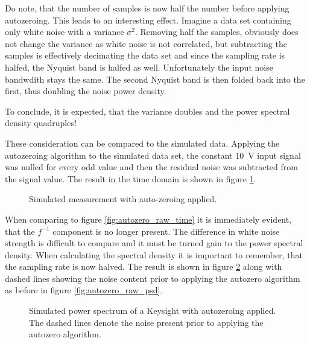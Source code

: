 Do note, that the number of samples is now half the number before applying autozeroing. This leads to an interesting effect. Imagine a data set containing only white noise with a variance $\sigma^2$. Removing half the samples, obviously does not change the variance as white noise is not correlated, but subtracting the samples is effectively decimating the data set and since the sampling rate is halfed, the Nyquist band is halfed as well. Unfortunately the input noise bandwdith stays the same. The second Nyquist band is then folded back into the first, thus doubling the noise power density.

To conclude, it is expected, that the variance doubles and the power spectral density quadruples!

These consideration can be compared to the simulated data. Applying the autozeroing algorithm to the simulated data set, the constant \qty{10}{\V} input signal was nulled for every odd value and then the residual noise was subtracted from the signal value. The result in the time domain is shown in figure \ref{fig:autozero_time}.

\begin{figure}[hb]
    \centering
    
    \caption{Simulated measurement with auto-zeroing applied.}
    \label{fig:autozero_time}
\end{figure}

When comparing to figure \ref{fig:autozero_raw_time} it is immediately evident, that the $f^{-1}$ component is no longer present. The difference in white noise strength is difficult to compare and it must be turned gain to the power spectral density. When calculating the spectral density it is important to remember, that the sampling rate is now halved. The result is shown in figure \ref{fig:autozero_psd} along with dashed lines showing the noise content prior to applying the autozero algorithm as before in figure \ref{fig:autozero_raw_psd}.

\begin{figure}[ht]
    \centering
    
    \caption{Simulated power spectrum of a Keysight  with autozeroing applied. The dashed lines denote the noise present prior to applying the autozero algorithm.}
    \label{fig:autozero_psd}
\end{figure}

